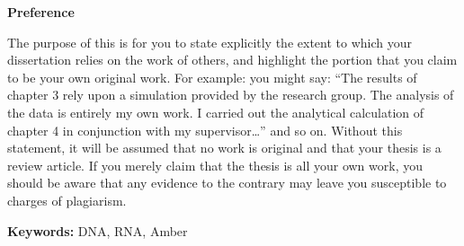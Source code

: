 \begin{center}
\textbf{\Large{Preference}}
\end{center}
\vspace{0.7cm}
\par
The purpose of this is for you to state explicitly the extent to which your dissertation relies on the work of others, and highlight the portion that you claim to be your own original work.  For example: you might say: “The results of chapter 3 rely upon a simulation provided by the research group.  The analysis of the data is entirely my own work.  I carried out the analytical calculation of chapter 4 in conjunction with my supervisor…” and so on.  Without this statement, it will be assumed that no work is original and that your thesis is a review article.  If you merely claim that the thesis is all your own work, you should be aware that any evidence to the contrary may leave you susceptible to charges of plagiarism.

\noindent
\textbf{Keywords: } DNA, RNA, Amber